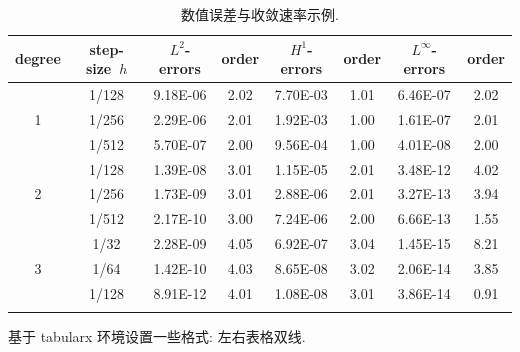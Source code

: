 \documentclass[UTF8,openany,twoside,12pt]{book}
\theoremstyle{plain}
\begin{document}
\begin{table}[!htp]
\centering
\renewcommand\arraystretch{1.0} %
\caption{数值误差与收敛速率示例.}
\label{tab:error1}
\begin{tabular}{c|c|cc|cc|cc}
\Xhline{2\arrayrulewidth}
degree &  step-size~$h$  & $L^2$-errors  &  order  & $H^1$-errors & order & $L^\infty$-errors  &  order \\
\hline
   &  1/128    & 9.18E-06    &2.02    & 7.70E-03  &1.01       & 6.46E-07    &2.02    \\
1  &  1/256    & 2.29E-06    &2.01    & 1.92E-03  &1.00       & 1.61E-07    &2.01      \\
   &  1/512    & 5.70E-07    &2.00    & 9.56E-04  &1.00       & 4.01E-08    &2.00       \\
\hline  %
   &  1/128    & 1.39E-08    &3.01    & 1.15E-05  &2.01       & 3.48E-12   &4.02       \\
2  &  1/256    & 1.73E-09    &3.01    & 2.88E-06  &2.01       & 3.27E-13   &3.94      \\
   &  1/512    & 2.17E-10    &3.00    & 7.24E-06  &2.00       & 6.66E-13   &1.55     \\
\hline  %
   &  1/32     & 2.28E-09    &4.05    & 6.92E-07  &3.04       & 1.45E-15   &8.21       \\
3  &  1/64     & 1.42E-10    &4.03    & 8.65E-08  &3.02       & 2.06E-14   &3.85       \\
   &  1/128    & 8.91E-12    &4.01    & 1.08E-08  &3.01       & 3.86E-14   &0.91       \\
\Xhline{2\arrayrulewidth}
\end{tabular}
\end{table}

基于 tabularx 环境设置一些格式: 左右表格双线.
\end{document}
